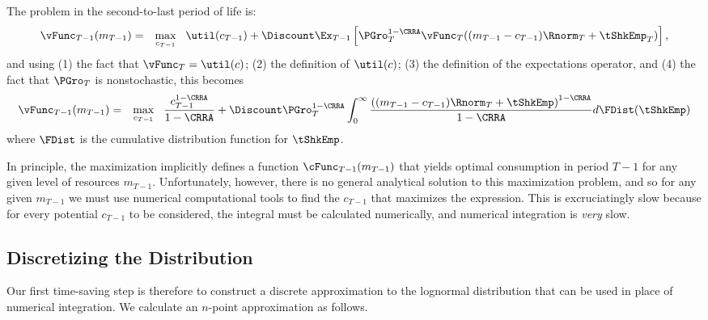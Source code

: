 \documentclass[titlepage]{\econtex}
\begin{document}
The problem in the second-to-last period of life is:
\begin{eqnarray*}
\null{\vFunc}_{T-1}({m}_{T-1}) & = & \max_{{c}_{T-1}} ~~ \util({c}_{T-1}) +
\Discount \Ex_{T-1} \left[\PGro_{T}^{1-\CRRA}\null{\vFunc}_{T}(({m}_{T-1} - {c}_{T-1})\Rnorm_{T} + \tShkEmp_{T})\right],
\end{eqnarray*}
and using (1) the fact that $\vFunc_{T}=\util(c)$; (2) the definition of $\util(c)$; (3) the
definition of the expectations operator, and (4) the fact that $\PGro_{T}$ is nonstochastic, this becomes
\begin{eqnarray*}
\null{\vFunc}_{T-1}({m}_{T-1})  & = & \max_{{c}_{T-1}} ~~
\frac{{c}_{T-1}^{1-\CRRA}}{1-\CRRA} + \Discount \PGro_{T}^{1-\CRRA}\int_{0}^{\infty}
\frac{\left(({m}_{T-1}-{c}_{T-1})\Rnorm_{T}+ \tShkEmp\right)^{1-\CRRA}}{1-\CRRA}
d\FDist(\tShkEmp)
\end{eqnarray*}
where $\FDist$ is the cumulative distribution function for ${\tShkEmp}$.

In principle, the maximization implicitly defines a function  
$\cFunc_{T-1}({m}_{T-1})$ that yields optimal consumption
in period $T-1$ for any given level of resources ${m}_{T-1}$.
Unfortunately, however, there is no general analytical solution to this
maximization problem, and so for any given ${m}_{T-1}$ we must
use numerical computational tools to find the ${c}_{T-1}$ that maximizes the
expression.  This is excruciatingly slow because for every
potential ${c}_{T-1}$ to be considered, the integral must be calculated
numerically, and numerical integration is \textit{very} slow.

\hypertarget{Discretizing-the-Distribution}{}
\subsection{Discretizing the Distribution}
Our first time-saving step is therefore to construct a discrete
approximation to the lognormal distribution that can be used in place
of numerical integration.  We calculate an $n$-point approximation as
follows.
\end{document}
